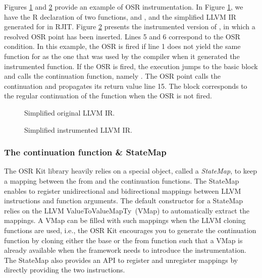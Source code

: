 Figures \ref{fig:simplifiedoriginalir} and \ref{fig:simplifiedinstrumentedir} provide an example of OSR instrumentation.
In Figure \ref{fig:simplifiedoriginalir}, we have the R declaration of two functions,  and , and the simplified LLVM IR generated for  in RJIT.
Figure \ref{fig:simplifiedinstrumentedir} presents the instrumented version of , in which a resolved OSR point has been inserted.
Lines 5 and 6 correspond to the OSR condition.
In this example, the OSR is fired if line 1 does not yield the same function for  as the one that was used by the compiler when it generated the instrumented function.
If the OSR is fired, the execution jumps to the  basic block and calls the continuation function, namely .
The OSR point  calls the continuation and propagates its return value line 15.
The  block corresponds to the regular continuation of the function  when the OSR is not fired.\\

\begin{figure}[h]
\caption{Simplified original LLVM IR.}
\label{fig:simplifiedoriginalir}
\end{figure}

\begin{figure}[h]
\caption{Simplified instrumented LLVM IR.}
\label{fig:simplifiedinstrumentedir}
\end{figure}

\subsubsection{The continuation function \& StateMap}

The OSR Kit library heavily relies on a special object, called a \textit{StateMap}, to keep a mapping between the from and the continuation functions.
The StateMap enables to register unidirectional and bidirectional mappings between LLVM instructions and function arguments.
The default constructor for a StateMap relies on the LLVM ValueToValueMapTy~\cite{VMap}(VMap) to automatically extract the mappings.
A VMap can be filled with such mappings when the LLVM cloning functions are used, i.e., the OSR Kit encourages you to generate the continuation function by cloning either the base or the from function such that a VMap is already available when the framework needs to introduce the instrumentation.
The StateMap also provides an API to register and unregister mappings by directly providing the two instructions.\\

